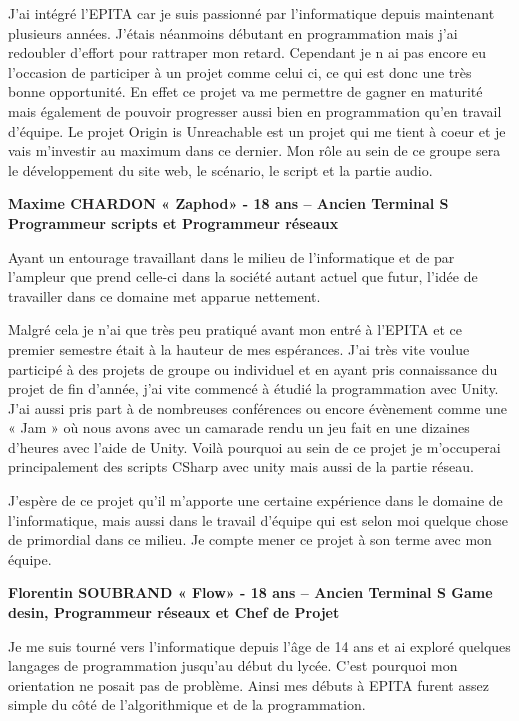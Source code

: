 \documentclass[12pt,a4paper]{article}
\begin{document}
J'ai intégré l'EPITA car je suis passionné par l'informatique depuis maintenant plusieurs années. J'étais néanmoins débutant en programmation mais j'ai redoubler d'effort pour rattraper mon retard. Cependant je n ai pas encore eu l'occasion de participer à un projet comme celui ci, ce qui est donc une très bonne opportunité. En effet ce projet va me permettre de gagner en maturité mais également de pouvoir progresser aussi bien en programmation qu'en travail d'équipe. Le projet Origin is Unreachable est un projet qui me tient à coeur et je vais m'investir au maximum dans ce dernier. Mon rôle au sein de ce groupe sera le développement du site web, le scénario, le script et la partie audio. 
\newpage
\begin{center}
\textbf{Maxime CHARDON « Zaphod» - 18 ans – Ancien Terminal S
Programmeur scripts et Programmeur réseaux}
\end{center}

Ayant un entourage travaillant dans le milieu de l’informatique et de par l’ampleur que prend celle-ci dans la société autant actuel que futur, l’idée de travailler dans ce domaine met apparue nettement.

Malgré cela je n’ai que très peu pratiqué avant mon entré à l’EPITA et ce premier semestre était à la hauteur de mes espérances. J’ai très vite voulue participé à des projets de groupe ou individuel et en ayant pris connaissance du projet de fin d’année, j’ai vite commencé à étudié la programmation avec Unity. J’ai aussi pris part à de nombreuses conférences ou encore évènement comme une « Jam » où nous avons avec un camarade rendu un jeu fait en une dizaines d’heures avec l’aide de Unity. Voilà pourquoi au sein de ce projet je m’occuperai principalement des scripts CSharp avec unity mais aussi de la partie réseau.

J’espère de ce projet qu’il m’apporte une certaine expérience dans le domaine de l’informatique, mais aussi dans le travail d’équipe qui est selon moi quelque chose de primordial dans ce milieu. Je compte mener ce projet à son terme avec mon équipe.

\begin{center}
\textbf{Florentin SOUBRAND « Flow» - 18 ans – Ancien Terminal S \newline
Game desin, Programmeur réseaux et Chef de Projet}
\end{center}
	Je me suis tourné vers l'informatique depuis l'âge de 14 ans et ai exploré quelques langages de programmation jusqu'au début du lycée. C'est pourquoi mon orientation ne posait pas de problème. Ainsi mes débuts à EPITA furent assez simple du côté de l'algorithmique et de la programmation.
\end{document}
